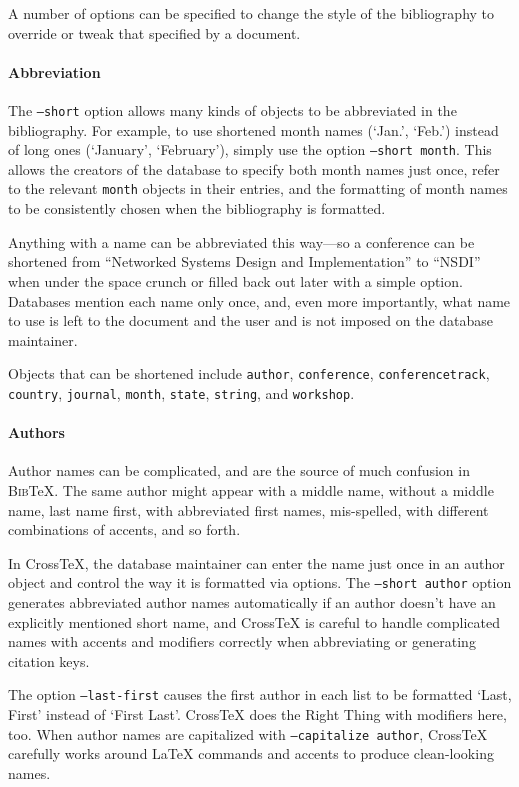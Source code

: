 \documentclass{article}
\newcommand{\XTeX}{Cross\TeX}
\newcommand{\BibTeX}{\textsc{Bib}\TeX}
\begin{document}
A number of options can be specified to change the style of the bibliography to override or tweak that specified by a document.

\paragraph{Abbreviation}

The \texttt{--short} option allows many kinds of objects to be abbreviated in the bibliography. For example, to use shortened month names (`Jan.', `Feb.') instead of long ones (`January', `February'), simply use the option \texttt{--short month}. This allows the creators of the database to specify both month names just once, refer to the relevant \texttt{month} objects in their entries, and the formatting of month names to be consistently chosen when the bibliography is formatted.

Anything with a name can be abbreviated this way---so a conference can be shortened from ``Networked Systems Design and Implementation'' to ``NSDI'' when under the space crunch or filled back out later with a simple option. Databases mention each name only once, and, even more importantly, what name to use is left to the document and the user and is not imposed on the database maintainer.

Objects that can be shortened include \texttt{author}, \texttt{conference}, \texttt{conferencetrack}, \texttt{country}, \texttt{journal}, \texttt{month}, \texttt{state}, \texttt{string}, and \texttt{workshop}.

\paragraph{Authors}

Author names can be complicated, and are the source of much confusion
in \BibTeX{}. The same author might appear with a middle name, without
a middle name, last name first, with abbreviated first names, mis-spelled,
with different combinations of accents, and so forth.

In \XTeX{}, the database maintainer can enter the name just once in an
author object and control the way it is formatted via options. The
\texttt{--short author} option generates abbreviated author names
automatically if an author doesn't have an explicitly mentioned short
name, and \XTeX{} is careful to handle complicated names with accents
and modifiers correctly when abbreviating or generating citation keys.

The option \texttt{--last-first} causes the first author in each list to be formatted `Last, First' instead of `First Last'.  \XTeX{} does the Right Thing with modifiers here, too.  When author names are capitalized with \texttt{--capitalize author}, \XTeX{} carefully works around \LaTeX{} commands and accents to produce clean-looking names.
\end{document}

